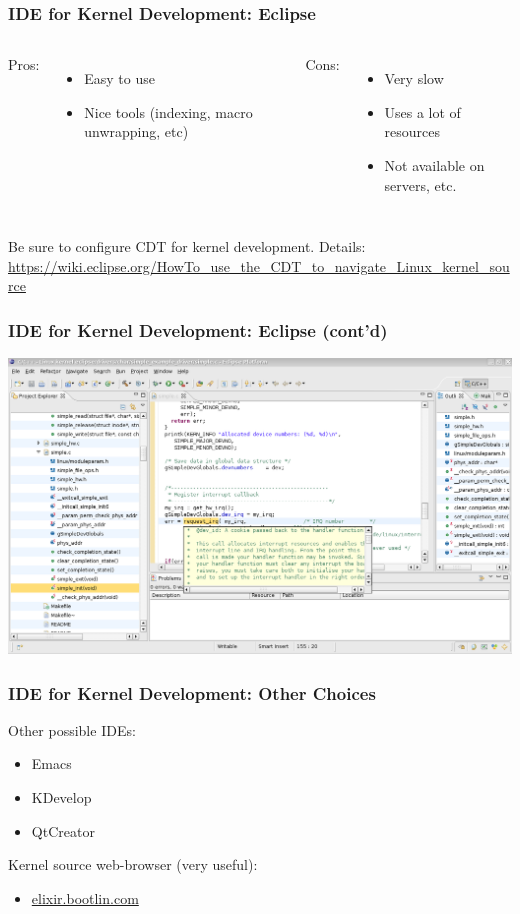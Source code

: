 \begin{frame}
  \frametitle{IDE for Kernel Development: Eclipse}
  \begin{columns}
    Pros:
    \begin{itemize}
      \item Easy to use
      \item Nice tools (indexing, macro unwrapping, etc)
    \end{itemize}
    Cons:
    \begin{itemize}
      \item Very slow
      \item Uses a lot of resources
      \item Not available on servers, etc.
    \end{itemize}
  \end{columns}
  \bigskip
  Be sure to configure CDT for kernel development.
  Details: \href{https://wiki.eclipse.org/HowTo\_use\_the\_CDT\_to\_navigate\_Linux\_kernel\_source}
                {https://wiki.eclipse.org/HowTo\_use\_the\_CDT\_to\_navigate\_Linux\_kernel\_source}
\end{frame}

\begin{frame}
  \frametitle{IDE for Kernel Development: Eclipse (cont'd)}
  \begin{center}
    \includegraphics[scale=0.35]{images/eclipse.png}
  \end{center}
  \vspace*{-10mm} %
\end{frame}

\begin{frame}
  \frametitle{IDE for Kernel Development: Other Choices}
  Other possible IDEs:
  \begin{itemize}
    \item Emacs
    \item KDevelop
    \item QtCreator
  \end{itemize}

  Kernel source web-browser (very useful):
  \begin{itemize}
    \item \href{elixir.bootlin.com}{elixir.bootlin.com}
  \end{itemize}
\end{frame}

